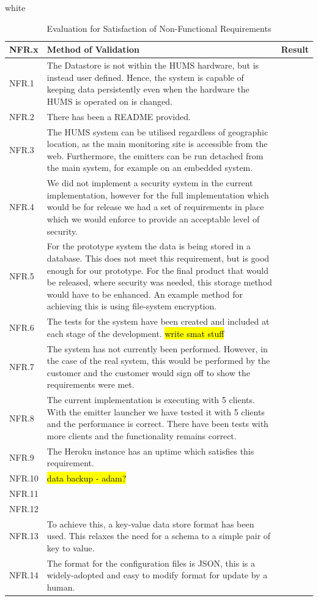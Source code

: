\documentclass[10pt,a4paper]{article}
\newcommand{\xtableformat}[4]{
\begin{table}[ht!]
\centering
  \rowcolors{2}{gray!10} {white}
\begin{tabularx}{\textwidth}{#1}
  \hline
  \rowcolor[gray]{0.9} #2
  \hline
\end{tabularx}
\caption{#3}
\label{#4}
\end{table}}
\begin{document}
\xtableformat{ p{1.3cm} X X }{
	NFR.x  & 	Method of Validation & Result \\ \hline
	NFR.1  &The Datastore is not within the HUMS hardware, but is instead user defined. Hence, the system is capable of keeping data persistently even when the hardware the HUMS is operated on is changed. 	  & 	 \\ 
	NFR.2  &There has been a README provided. 	  & 	 \\ 
	NFR.3  & 	The HUMS system can be utilised regardless of geographic location, as the main monitoring site is accessible from the web. Furthermore, the emitters can be run detached from the main system, for example on an embedded system. 	  & 	 \\ 
	NFR.4  &We did not implement a security system in the current implementation, however for the full implementation which would be for release we had a set of requirements in place which we would enforce to provide an acceptable level of security. 	  & 	\\ 
	NFR.5  & For the prototype system the data is being stored in a database. This does not meet this requirement, but is good enough for our prototype. For the final product that would be released, where security was needed, this storage method would have to be enhanced. An example method for achieving this is using file-system encryption. & \\
	NFR.6  &The tests for the system have been created and included at each stage of the development. \hl{write smat stuff} 	  & 	\\
	NFR.7  &The system has not currently been performed. However, in the case of the real system, this would be performed by the customer and the customer would sign off to show the requirements were met. 	  & 	 \\
	NFR.8  &The current implementation is executing with 5 clients. With the emitter launcher we have tested it with 5 clients and the performance is correct. There have been tests with more clients and the functionality remains correct.	  & 	 \\ 
	NFR.9  & The Heroku instance has an uptime which satisfies this requirement.	  & 	 \\ 
	NFR.10  & \hl{data backup - adam?}	  & 	 \\ 
	NFR.11  & 	  & 	 \\ 
	NFR.12  & 	  & 	 \\ 
	NFR.13  & 	To achieve this, a key-value data store format has been used. This relaxes the need for a schema to a simple pair of key to value.  & 	 \\
	NFR.14  & 	The format for the configuration files is JSON, this is a widely-adopted and easy to modify format for update by a human.  & 	 \\
}{Evaluation for Satisfaction of Non-Functional Requirements}{nfrevaltable} %
\end{document}
